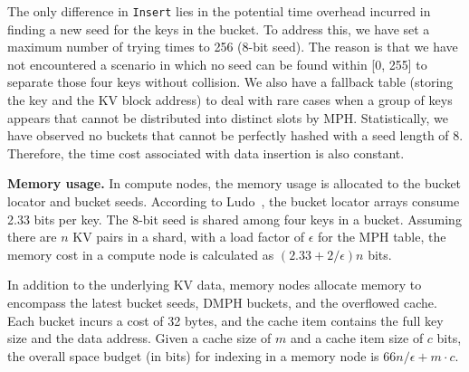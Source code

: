The only difference in \texttt{Insert} lies in the potential time overhead incurred in finding a new seed for the keys in the bucket. To address this, we have set a maximum number of trying times to 256 (8-bit seed). The reason is that we have not encountered a scenario in which no seed can be found within [0, 255] to separate those four keys without collision. We also have a fallback table (storing the key and the KV block address) to deal with rare cases when a group of keys appears that cannot be distributed into distinct slots by MPH. Statistically, we have observed no buckets that cannot be perfectly hashed with a seed length of 8. Therefore, the time cost associated with data insertion is also constant.

\noindent\textbf{Memory usage.}
In compute nodes, the memory usage is allocated to the bucket locator and bucket seeds. According to Ludo~\cite{ludo}, the bucket locator arrays consume 2.33 bits per key. The 8-bit seed is shared among four keys in a bucket. Assuming there are $n$ KV pairs in a shard, with a load factor of $\epsilon$ for the MPH table, the memory cost in a compute node is calculated as $(2.33+2/\epsilon)n$ bits.

In addition to the underlying KV data, memory nodes allocate memory to encompass the latest bucket seeds, DMPH buckets, and the overflowed cache. Each bucket incurs a cost of 32 bytes, and the cache item contains the full key size and the data address. Given a cache size of $m$ and a cache item size of $c$ bits, the overall space budget (in bits) for indexing in a memory node is $66n/\epsilon+m\cdot c$.


